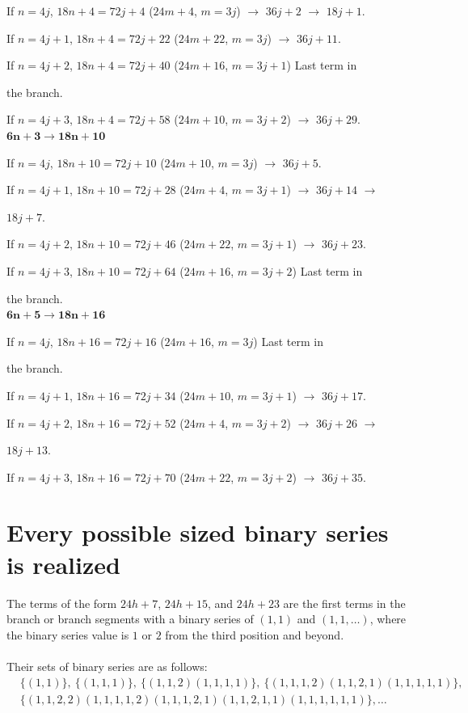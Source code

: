 \documentclass[sn-mathphys-num, pdflatex]{sn-jnl}
\begin{document}
If $n = 4j$,   $18n+4 = 72j+4$ ($24m+4$, $m=3j$) $\to$  $36j+2$ $\to$  $18j+1$. 

If $n = 4j+1$, $18n+4 = 72j+22$ ($24m+22$, $m=3j$) $\to$  $36j+11$.

If $n = 4j+2$, $18n+4 = 72j+40$ ($24m+16$, $m=3j+1$) Last term in 

the branch.

If $n = 4j+3$, $18n+4 = 72j+58$ ($24m+10$, $m=3j+2$) $\to$ $36j+29$. \\

$\boldsymbol{6n+3} \to \boldsymbol{18n+10}$ 

If $n = 4j$, $18n+10 = 72j+10$ ($24m+10$,  $m=3j$) $\to$  $36j+5$.

If $n = 4j+1$, $18n+10 = 72j+28$ ($24m+4$,  $m=3j+1$) $\to$  $36j+14$ $\to$

$18j+7$. 

If $n = 4j+2$, $18n+10 = 72j+46$ ($24m+22$, $m=3j+1$) $\to$  $36j+23$. 

If $n = 4j+3$, $18n+10 = 72j+64$ ($24m+16$, $m=3j+2$) Last term in 

the branch. \\

$\boldsymbol{6n+5} \to \boldsymbol{18n+16}$  

If $n = 4j$,   $18n+16 = 72j+16$ ($24m+16$, $m=3j$) Last term in 

the branch.

If $n = 4j+1$, $18n+16 = 72j+34$ ($24m+10$, $m=3j+1$) $\to$  $36j+17$.

If $n = 4j+2$, $18n+16 = 72j+52$ ($24m+4$,  $m=3j+2$) $\to$  $36j+26$ $\to$

$18j+13$.

If $n = 4j+3$, $18n+16 = 72j+70$ ($24m+22$, $m=3j+2$) $\to$  $36j+35$.


\section{Every possible sized binary series is realized}\label{app2}
The terms of the form $24h+7$, $24h+15$, and $24h+23$ are the first terms in the branch or branch segments with a binary series of $(1,1)$ and $(1,1,\ldots)$, where the binary series value is $1$ or $2$ from the third position and beyond.\\ \\
Their sets of binary series are as follows:
$$\begin{array}{ll} &\{(1,1)\},\ \{(1,1,1)\},\ \{(1,1,2) (1,1,1,1)\},\ \{(1,1,1,2) (1,1,2,1)(1,1,1,1,1)\},\\ & \{(1,1,2,2)(1,1,1,1,2) (1,1,1,2,1) (1,1,2,1,1) (1,1,1,1,1,1)\},\ldots \end{array}$$
\end{document}
